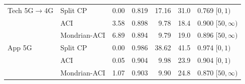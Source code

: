 \begin{table}[!t]
\begin{tabular}{llrrrrl}
\midrule
Tech 5G$\rightarrow$4G & Split CP & 0.00 & 0.819 & 17.16 & 31.0 & 0.769 $[0,1)$ \\
 & ACI & 3.58 & 0.898 & 9.78 & 18.4 & 0.900 $[50,\infty)$ \\
 & Mondrian-ACI & 6.89 & 0.894 & 9.79 & 19.0 & 0.896 $[50,\infty)$ \\
\midrule
App 5G & Split CP & 0.00 & 0.986 & 38.62 & 41.5 & 0.974 $[0,1)$ \\
 & ACI & 0.05 & 0.904 & 9.98 & 23.9 & 0.904 $[0,1)$ \\
 & Mondrian-ACI & 1.07 & 0.903 & 9.90 & 24.8 & 0.870 $[50,\infty)$ \\
\bottomrule
\end{tabular}
\end{table}

